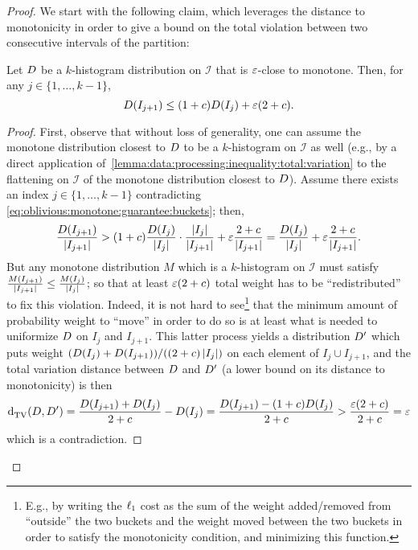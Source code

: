 \begin{proof}
    We start with the following claim, which leverages the distance to monotonicity in order to give a bound on the total violation between two consecutive intervals of the partition:
    \begin{claim}\label{claim:oblivious:monotone:guarantee:buckets}
      Let $\D$ be a $k$-histogram distribution on $\mathcal{I}$ that is $\eps$-close to monotone. Then, for any $j\in\{1,\dots,k-1\}$,
      \begin{equation}\label{eq:oblivious:monotone:guarantee:buckets}
	      D(I_{j+1}) \leq (1+c)D(I_{j})+\eps(2+c).
      \end{equation}
    \end{claim}
    \begin{proof}
    First, observe that without loss of generality, one can assume the monotone distribution closest to $\D$ to be a $k$-histogram on $\mathcal{I}$ as well (e.g., by a direct application of~\cref{lemma:data:processing:inequality:total:variation} to the flattening on $\mathcal{I}$ of the monotone distribution closest to $\D$). Assume there exists an index $j\in\{1,\dots,k-1\}$ contradicting \eqref{eq:oblivious:monotone:guarantee:buckets}; then,
    \[
	    \frac{\D(I_{j+1})}{\abs{I_{j+1}}} > (1+c)\frac{\D(I_{j})}{\abs{I_{j}}}\cdot\frac{\abs{I_{j}}}{\abs{I_{j+1}}} + \eps\frac{ 2+c }{ \abs{I_{j+1}}  } = \frac{\D(I_{j})}{\abs{I_{j}}} +   \eps\frac{ 2+c }{ \abs{I_{j+1}}  }.
    \]
    But any  monotone distribution $M$ which is a $k$-histogram on $\mathcal{I}$ must satisfy $\frac{M(I_{j+1})}{\abs{I_{j+1}}} \leq \frac{M(I_{j})}{\abs{I_{j}}}$; so that at least  $\eps(2+c)$ total {weight} has to be ``redistributed'' to fix this violation.     Indeed, it is not hard to see\footnote{E.g., by writing the $\lp[1]$ cost as the sum of the weight added/removed from ``outside'' the two buckets and the {weight} moved between the two buckets in order to satisfy the monotonicity condition, and minimizing this function.}
     that the minimum amount of probability weight to ``move'' in order to do so is at least what is needed to uniformize $\D$ on $I_j$ and $I_{j+1}$. 
    This latter process yields a distribution $\D^\prime$  
    which puts weight $(\D(I_j)+\D(I_{j+1}))/((2+c)\abs{I_j})$
    on each element of $I_j\cup I_{j+1}$, and the total variation distance between $\D$ and $\D^\prime$ (a lower bound on its distance to monotonicity) is then
    \[
	    \totalvardist{\D}{\D^\prime}=\frac{\D(I_{j+1})+\D(I_j)}{2+c}-\D(I_j) = \frac{\D(I_{j+1})-(1+c)\D(I_j)}{2+c} > \frac{\eps(2+c)}{2+c}=\eps
    \]
    which is a contradiction.

\end{proof}
\end{proof}
